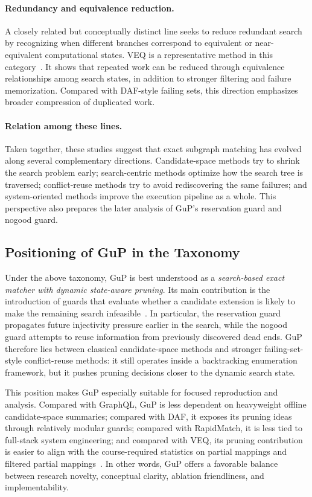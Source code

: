 \paragraph{Redundancy and equivalence reduction.}
A closely related but conceptually distinct line seeks to reduce redundant search by recognizing when different branches correspond to equivalent or near-equivalent computational states. VEQ is a representative method in this category~\cite{kim2022veq}. It shows that repeated work can be reduced through equivalence relationships among search states, in addition to stronger filtering and failure memorization. Compared with DAF-style failing sets, this direction emphasizes broader compression of duplicated work.

\paragraph{Relation among these lines.}
Taken together, these studies suggest that exact subgraph matching has evolved along several complementary directions. Candidate-space methods try to shrink the search problem early; search-centric methods optimize how the search tree is traversed; conflict-reuse methods try to avoid rediscovering the same failures; and system-oriented methods improve the execution pipeline as a whole. This perspective also prepares the later analysis of GuP's reservation guard and nogood guard.

\subsection{Positioning of GuP in the Taxonomy}

Under the above taxonomy, GuP is best understood as a \emph{search-based exact matcher with dynamic state-aware pruning}. Its main contribution is the introduction of guards that evaluate whether a candidate extension is likely to make the remaining search infeasible~\cite{arai2023gup}. In particular, the reservation guard propagates future injectivity pressure earlier in the search, while the nogood guard attempts to reuse information from previously discovered dead ends. GuP therefore lies between classical candidate-space methods and stronger failing-set-style conflict-reuse methods: it still operates inside a backtracking enumeration framework, but it pushes pruning decisions closer to the dynamic search state.

This position makes GuP especially suitable for focused reproduction and analysis. Compared with GraphQL, GuP is less dependent on heavyweight offline candidate-space summaries; compared with DAF, it exposes its pruning ideas through relatively modular guards; compared with RapidMatch, it is less tied to full-stack system engineering; and compared with VEQ, its pruning contribution is easier to align with the course-required statistics on partial mappings and filtered partial mappings~\cite{he2008graphql,han2019daf,sun2021rapidmatch,kim2022veq,arai2023gup}. In other words, GuP offers a favorable balance between research novelty, conceptual clarity, ablation friendliness, and implementability.

